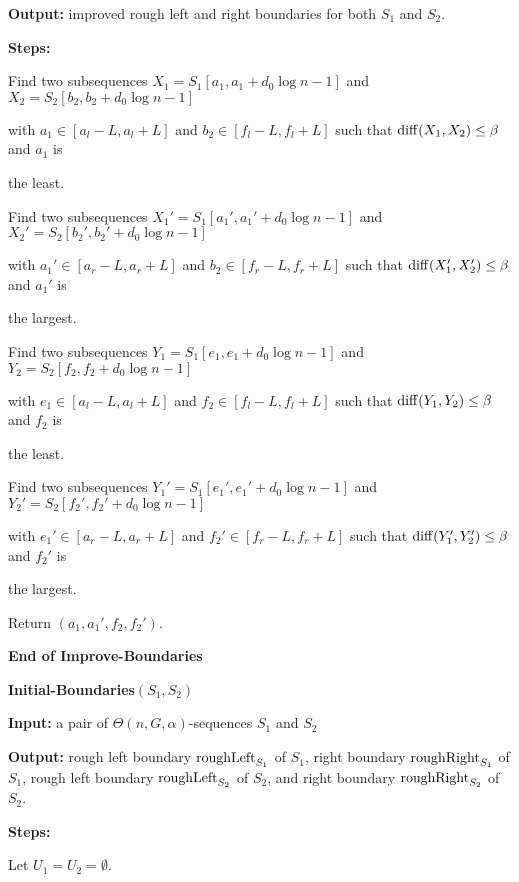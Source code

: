 \documentclass[11pt]{article}
\newcommand{\diff}{{\rm diff}}
\newcommand{\roughright}{{\rm roughRight}}
\begin{document}
{\bf Output:} improved rough left and right boundaries for both
$S_1$ and $S_2$.


 {\bf Steps:}








\qquad Find two subsequences $X_1=S_1[a_1,a_1+d_0\log n-1]$ and
$X_2=S_2[b_2,b_2+d_0\log n-1]$




\qquad with $a_1\in [a_l-L, a_l+L]$ and $b_2\in [f_l-L, f_l+L]$ such
that $\diff(X_1,X_2)\le \beta$ and $a_1$ is

\qquad the least.


\qquad Find two subsequences $X_1'=S_1[a_1',a_1'+d_0\log n-1]$ and
$X_2'=S_2[b_2',b_2'+d_0\log n-1]$

\qquad with $a_1'\in [a_r-L, a_r+L]$ and $b_2\in [f_r-L, f_r+L]$
such that  $\diff(X_1',X_2')\le \beta$ and  $a_1'$ is

\qquad the largest.


\qquad Find two subsequences $Y_1=S_1[e_1,e_1+d_0\log n-1]$ and
$Y_2=S_2[f_2,f_2+d_0\log n-1]$

\qquad with $e_1\in [a_l-L, a_l+L]$ and $f_2\in [f_l-L, f_l+L]$ such
that  $\diff(Y_1,Y_2)\le \beta$ and $f_2$ is


\qquad the least.


\qquad Find two subsequences $Y_1'=S_1[e_1',e_1'+d_0\log n-1]$ and
$Y_2'=S_2[f_2',f_2'+d_0\log n-1]$

\qquad with $e_1'\in [a_r-L, a_r+L]$ and $f_2'\in [f_r-L, f_r+L]$
such that  $\diff(Y_1',Y_2')\le \beta$ and $f_2'$ is

\qquad  the largest.

\qquad Return $(a_1,a_1',f_2,f_2')$.

{\bf End of Improve-Boundaries}







\vskip 10pt {\bf Initial-Boundaries$(S_1,S_2)$}

{\bf Input:} a pair of $\Theta(n,G,\alpha)$-sequences $S_1$ and
$S_2$

{\bf Output:} rough left boundary ${\rm roughLeft}_{S_1}$ of $S_1$, right
boundary $\roughright_{S_1}$ of $S_1$, rough left boundary
${\rm roughLeft}_{S_2}$ of $S_2$, and right boundary $\roughright_{S_2}$
of $S_2$.


 {\bf Steps:}

\qquad Let $U_1=U_2=\emptyset$.
\end{document}
